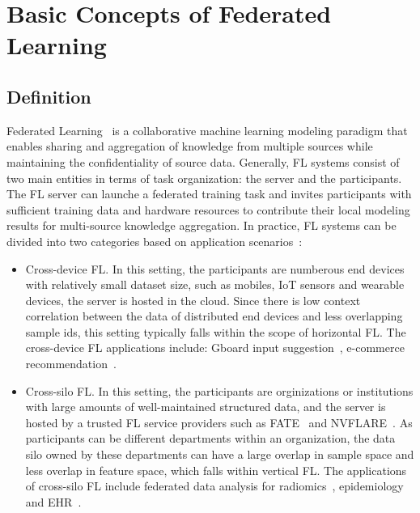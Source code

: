 \section{Basic Concepts of Federated Learning}
\label{sec:basic}
\subsection{Definition}
\label{sec:basicdefinition}
Federated Learning~\cite{IEEEstd3652, mcmahan2017communication} is a collaborative machine learning modeling paradigm that enables sharing and aggregation of knowledge from multiple sources while maintaining the confidentiality of source data.
Generally, FL systems consist of two main entities in terms of task organization: the server and the participants. 
The FL server can launche a federated training task and invites participants with sufficient training data and hardware resources to contribute their local modeling results for multi-source knowledge aggregation.
In practice, FL systems can be divided into two categories based on application scenarios~\cite{kairouz2021advances}:
\begin{itemize}
    \item Cross-device FL. In this setting, the participants are numberous end devices with relatively small dataset size, such as mobiles, IoT sensors and wearable devices, the server is hosted in the cloud. Since there is low context correlation between the data of distributed end devices and less overlapping sample ids, this setting typically falls within the scope of horizontal FL. The cross-device FL applications include: Gboard input suggestion~\cite{hard2018federated,ramaswamy2019federated,yang2018applied}, e-commerce recommendation~\cite{niu2020billion}.
    
    \item Cross-silo FL. In this setting, the participants are orginizations or institutions with large amounts of well-maintained structured data, and the server is hosted by a trusted FL service providers such as FATE~\cite{liu2021fate} and NVFLARE~\cite{roth2022nvidia}. As participants can be different departments within an organization, the data silo owned by these departments can have a large overlap in sample space and less overlap in feature space, which falls within vertical FL. The applications of cross-silo FL include federated data analysis for radiomics~\cite{li2019privacy, li2020multi, scherer2020joint}, epidemiology~\cite{dayan2021federated} and EHR~\cite{brisimi2018federated, huang2019patient}.
\end{itemize}

